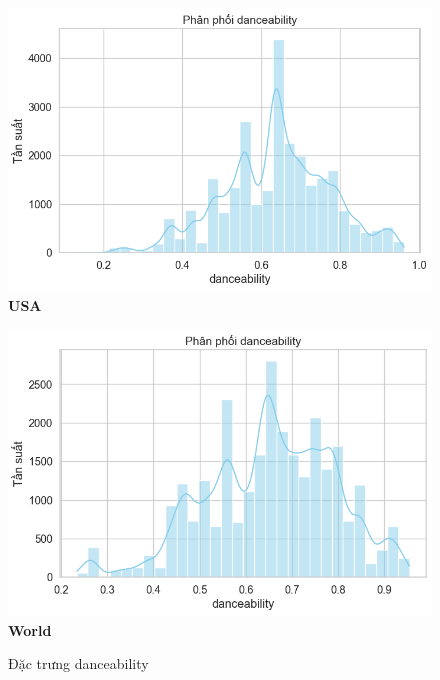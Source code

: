 \begin{itemize}
\begin{figure}[H]
        \begin{minipage}{0.395\textwidth}
            \centering
            \includegraphics[width=\linewidth]{../graphics/data_top50/figure/6/EDA_usa.png}
            \\[4pt] {\small \textbf{USA}}
        \end{minipage}
        \hfill
        \begin{minipage}{0.395\textwidth}
            \centering
            \includegraphics[width=\linewidth]{../graphics/data_top50/figure/6/EDA_world.png}
            \\[4pt] {\small \textbf{World}}
        \end{minipage}



        
        \caption{Đặc trưng danceability}
        \label{fig:energy-regions}
    \end{figure}
    


\end{itemize}
